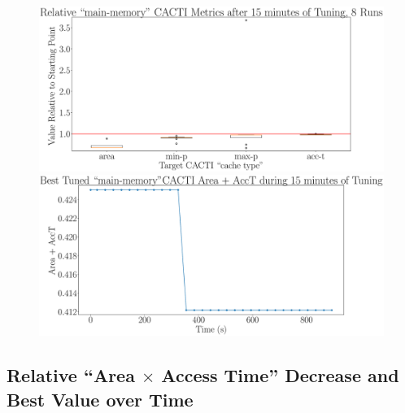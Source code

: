 \documentclass[12pt, a4paper]{article}
\begin{document}
\begin{figure}[htpb]
    \begin{minipage}{.48\textwidth}
        \centering
        \includegraphics[width=.8\textwidth]{target_area_plus_acct_900_main-memory}
    \end{minipage}%
    \begin{minipage}{.48\textwidth}
        \centering
        \includegraphics[width=.8\textwidth]{target_area_plus_acct_900_main-memory_best}
    \end{minipage}%
\end{figure}

\newpage

\subsection{Relative ``Area $\times$ Access Time'' Decrease and Best Value over Time}
\end{document}
